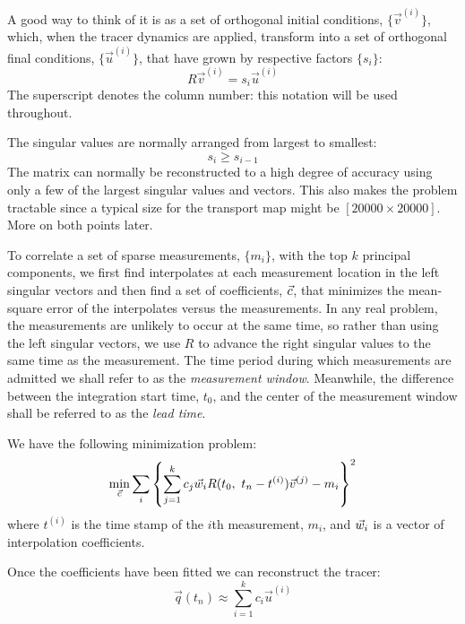 \documentclass{article}
\begin{document}
A good way to think of it is as a set of orthogonal initial conditions,
$\lbrace \vec v^{(i)} \rbrace$, which, when the tracer dynamics are applied,
transform into a set of orthogonal final conditions, 
$\lbrace \vec u^{(i)} \rbrace$,
that have grown by respective factors $\lbrace s_i \rbrace$:
\begin{equation}
	R \vec v^{(i)} = s_i \vec u^{(i)}
\end{equation}
The superscript denotes the column number: 
this notation will be used throughout.

The singular values are normally arranged from largest to smallest:
\begin{equation}
	s_i \ge s_{i-1}
\end{equation}
The matrix can normally be reconstructed to a high degree of accuracy
using only a few of the largest singular values and vectors.
This also makes the problem tractable since a typical size for
the transport map might be $[20000\times20000]$. More on both points later.

To correlate a set of sparse measurements, $\lbrace m_i \rbrace$,
with the top $k$ principal components, we first find interpolates at each
measurement location in the left singular vectors and then find a set
of coefficients, $\vec c$, that minimizes the mean-square error of the
interpolates versus the measurements.
In any real problem, the measurements are unlikely to occur at the same time,
so rather than using the left singular vectors, we use $R$ to advance the
right singular values to the same time as the measurement.
The time period during which measurements are admitted we shall refer to as
the {\it measurement window}.
Meanwhile, the difference between the integration start time, $t_0$,
and the center of the measurement window shall be referred to as the
{\it lead time}.

We have the following minimization problem:
\begin{equation}
	\min_{\vec c} \sum_i \left \lbrace \sum_{j=1}^k c_j \vec w_i R(t_0, ~ t_n-t^{(i)}) \vec v^{(j)} - m_i \right \rbrace^2
\end{equation}
where $t^{(i)}$ is the time stamp of the $i$th measurement, $m_i$, 
and $\vec w_i$ is a vector of interpolation coefficients.

Once the coefficients have been fitted we can reconstruct the tracer:
\begin{equation}
	\vec q(t_n) \approx \sum_{i=1}^k c_i \vec u^{(i)}
\end{equation}
\end{document}
